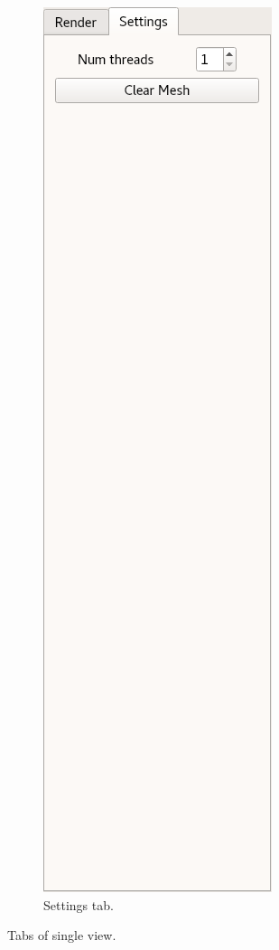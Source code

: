 \documentclass[12pt]{article}
\begin{document}
\begin{figure}
\begin{subfigure}{0.4\textwidth}
	\end{subfigure}
	\begin{subfigure}{0.4\textwidth}
		\centering
		\includegraphics[scale=0.8]{SV-settings}
		\caption{Settings tab.}
	\end{subfigure}
	\caption{Tabs of single view.}
	\vspace{-30pt}
\end{figure}
\end{document}
